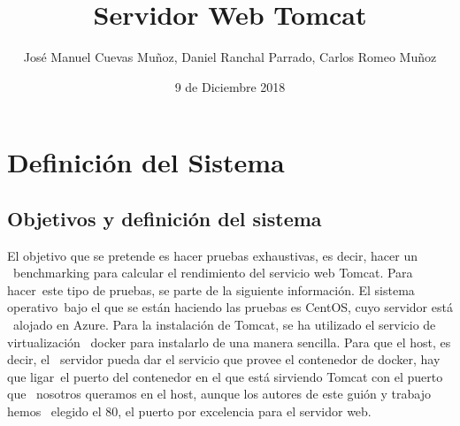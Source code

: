 \documentclass[11pt,twoside,a4paper]{book}
\title{\Huge Servidor Web Tomcat}
\author{José Manuel Cuevas Muñoz, Daniel Ranchal Parrado, Carlos Romeo Muñoz}
\date{9 de Diciembre 2018}
\begin{document}
\maketitle
%
%

\renewcommand\bibname{Bibliografía}
\renewcommand\tablename{Tabla}

 \fancyhf{} \pagestyle{fancy}
\fancyhead[LO]{\rightmark} %
\fancyhead[RE]{\leftmark} %
\fancyhead[RO,LE]{\thepage} %
\setlength{\headheight}{14pt}
\renewcommand{\sectionmark}[1]{\markright{{\thesection. #1}}} %
\tableofcontents
\listoffigures
%
%

\chapter{Definición del Sistema}
\section{Objetivos y definición del sistema}
El objetivo que se pretende es hacer pruebas exhaustivas, es decir, hacer un \
benchmarking para calcular el rendimiento del servicio web Tomcat. Para hacer\
este tipo de pruebas, se parte de la siguiente información. El sistema operativo\
bajo el que se están haciendo las pruebas es CentOS, cuyo servidor está \
alojado en Azure.
\newline
Para la instalación de Tomcat, se ha utilizado el servicio de virtualización \
docker para instalarlo de una manera sencilla. Para que el host, es decir, el \
servidor pueda dar el servicio que provee el contenedor de docker, hay que ligar\
el puerto del contenedor en el que está sirviendo Tomcat con el puerto que \
nosotros queramos en el host, aunque los autores de este guión y trabajo hemos \
elegido el 80, el puerto por excelencia para el servidor web.
\end{document}
